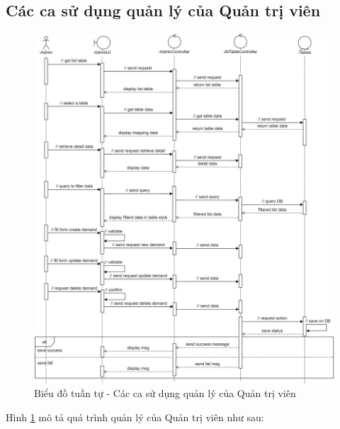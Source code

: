 \documentclass[./../main.tex]{subfiles}
\begin{document}
\subsection{Các ca sử dụng quản lý của Quản trị viên}
\begin{figure}[H]
	\centering
	\includegraphics[width=\linewidth]{./img/uc16-19.png}
	\caption{\label{tab:seq-uc11}Biểu đồ tuần tự - Các ca sử dụng quản lý của Quản trị viên}
\end{figure}
Hình \ref{tab:seq-uc11} mô tả quá trình quản lý của Quản trị viên như sau:
\end{document}
